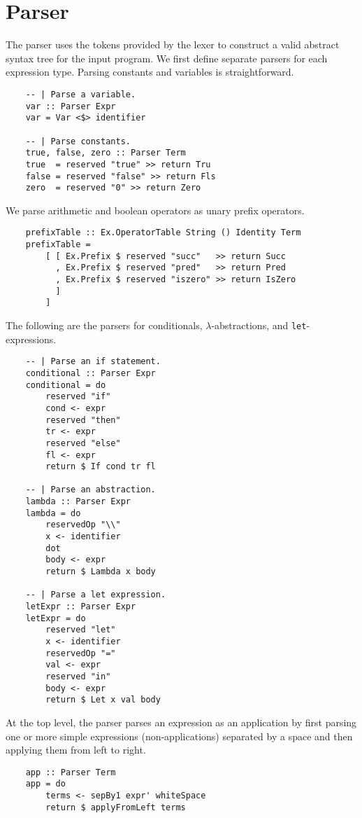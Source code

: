 \section{Parser}
The parser uses the tokens provided by the lexer to construct a valid abstract 
syntax tree for the input program. We first define separate parsers for each expression type. Parsing constants 
and variables is straightforward. 
\begin{lstlisting}
    -- | Parse a variable.
    var :: Parser Expr
    var = Var <$> identifier 

    -- | Parse constants.
    true, false, zero :: Parser Term
    true  = reserved "true" >> return Tru
    false = reserved "false" >> return Fls
    zero  = reserved "0" >> return Zero
\end{lstlisting}
We parse arithmetic and boolean operators as unary prefix operators.
\begin{lstlisting}
    prefixTable :: Ex.OperatorTable String () Identity Term
    prefixTable = 
        [ [ Ex.Prefix $ reserved "succ"   >> return Succ
          , Ex.Prefix $ reserved "pred"   >> return Pred
          , Ex.Prefix $ reserved "iszero" >> return IsZero
          ]
        ]
\end{lstlisting}
The following are the parsers for conditionals, $\lambda$-abstractions, and \texttt{let}-expressions.
\begin{lstlisting}
    -- | Parse an if statement.
    conditional :: Parser Expr
    conditional = do
        reserved "if"
        cond <- expr
        reserved "then"
        tr <- expr
        reserved "else"
        fl <- expr
        return $ If cond tr fl

    -- | Parse an abstraction.
    lambda :: Parser Expr
    lambda = do
        reservedOp "\\" 
        x <- identifier 
        dot 
        body <- expr
        return $ Lambda x body

    -- | Parse a let expression.
    letExpr :: Parser Expr 
    letExpr = do 
        reserved "let"
        x <- identifier
        reservedOp "=" 
        val <- expr
        reserved "in"
        body <- expr
        return $ Let x val body
\end{lstlisting}

At the top level, the parser parses an expression as an application by first parsing one or 
more simple expressions (non-applications) separated by a space and then applying them from left to right.
\begin{lstlisting}
    app :: Parser Term
    app = do
        terms <- sepBy1 expr' whiteSpace 
        return $ applyFromLeft terms
\end{lstlisting}

